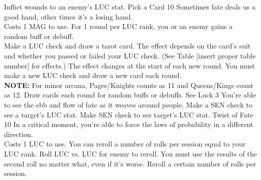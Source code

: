 \begin{path}
{Inflict wounds to an enemy's LUC stat.}
\skilldescription
{Pick a Card}
{10}
{Sometimes fate deals us a good hand, other times it's a losing hand.
\\Costs 1 MAG to use. For 1 round per LUC rank, you or an enemy gains a random buff or debuff.
\\Make a LUC check and draw a tarot card. The effect depends on the card’s suit and whether you passed or failed your LUC check. (See Table [insert proper table number] for effects.) The effect changes at the start of each new round. You must make a new LUC check and draw a new card each round.
\\\textbf{NOTE:} For minor arcana, Pages/Knights counts as 11 and Queens/Kings count as 12.}
{Draw cards each round for random buffs or debuffs.}
\skilldescription
{See Luck}
{3}
{You're able to see the ebb and flow of fate as it weaves around people. Make a SEN check to see a target's LUC stat.}
{Make SEN check to see target’s LUC stat.}
\skilldescription
{Twist of Fate}
{10}
{In a critical moment, you're able to force the laws of probability in a different direction.
\\Costs 1 LUC to use. You can reroll a number of rolls per session equal to your LUC rank. Roll LUC vs. LUC for enemy to reroll. You must use the results of the second roll no matter what, even if it's worse.}
{Reroll a certain number of rolls per session.}

\end{path}
